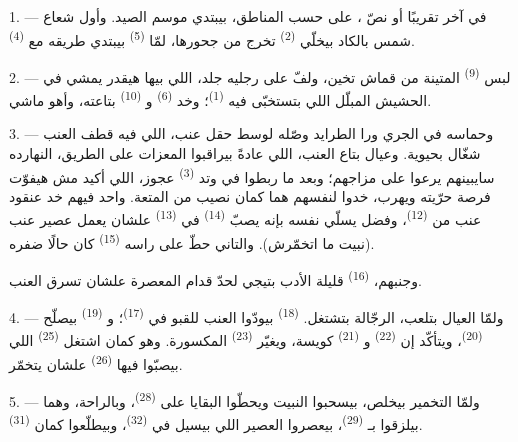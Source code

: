 \VUsaut{6.0mm}
\VUsaut{3.6mm}

\VUsaut{1.4mm}
\VUsaut{4.0mm}

1. --- في آخر  تقريبًا أو نصّ ، على حسب المناطق،
بيبتدي موسم الصيد. وأول شعاع شمس بالكاد بيخلّي  \textsuperscript{(2)}
تخرج من جحورها، لمّا  \textsuperscript{(5)} بيبتدي طريقه مع
 \textsuperscript{(4)}.

2. --- لبس  \textsuperscript{(9)} المتينة من قماش تخين، ولفّ على
رجليه  جلد، اللي بيها هيقدر يمشي في الحشيش المبلّل اللي بتستخبّى
فيه  \textsuperscript{(1)}؛ وخد  \textsuperscript{(6)}
و \textsuperscript{(10)} بتاعته، وأهو ماشي.

3. --- وحماسه في الجري ورا الطرايد وصّله لوسط حقل عنب، اللي فيه قطف العنب
شغّال بحيوية. وعيال بتاع العنب، اللي عادةً بيراقبوا المعزات على الطريق،
النهارده سايبينهم يرعوا على مزاجهم؛ وبعد ما ربطوا في وتد 
\textsuperscript{(3)} عجوز، اللي أكيد مش هيفوّت فرصة حرّيته ويهرب، خدوا لنفسهم
هما كمان نصيب من المتعة. واحد فيهم خد عنقود عنب من 
\textsuperscript{(12)}، وفضل يسلّي نفسه بإنه يصبّ  \textsuperscript{(14)}
في  \textsuperscript{(13)} علشان يعمل عصير عنب (نبيت ما اتخمّرش).
والتاني حطّ على راسه  \textsuperscript{(15)} كان حالًا ضفره.

وجنبهم،  \textsuperscript{(16)} قليلة الأدب بتيجي لحدّ قدام المعصرة
علشان تسرق العنب.

4. --- ولمّا العيال بتلعب، الرجّالة بتشتغل. 
\textsuperscript{(18)} بيودّوا العنب للقبو في  \textsuperscript{(17)}؛
و \textsuperscript{(19)} بيصلّح 
\textsuperscript{(20)}، ويتأكّد إن  \textsuperscript{(22)}
و \textsuperscript{(21)} كويسة، ويغيّر 
\textsuperscript{(23)} المكسورة. وهو كمان اشتغل 
\textsuperscript{(25)} اللي بيصبّوا فيها  \textsuperscript{(26)} علشان
يتخمّر.

5. --- ولمّا التخمير بيخلص، بيسحبوا النبيت ويحطّوا البقايا على 
\textsuperscript{(28)}، وبالراحة، وهما بيلزقوا بـ \textsuperscript{(29)}،
بيعصروا العصير اللي بيسيل في  \textsuperscript{(32)}، وبيطلّعوا
كمان  \textsuperscript{(31)}.

